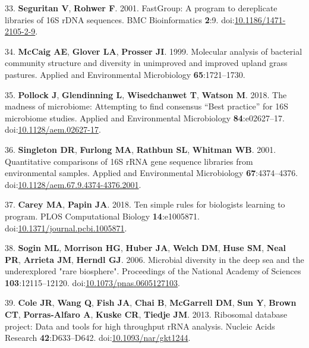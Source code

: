 \documentclass[11pt,]{article}
\begin{document}
\leavevmode\hypertarget{ref-Seguritan2001}{}%
33. \textbf{Seguritan V}, \textbf{Rohwer F}. 2001. FastGroup: A program
to dereplicate libraries of 16S rDNA sequences. BMC Bioinformatics
\textbf{2}:9.
doi:\href{https://doi.org/10.1186/1471-2105-2-9}{10.1186/1471-2105-2-9}.

\leavevmode\hypertarget{ref-McCaig1999}{}%
34. \textbf{McCaig AE}, \textbf{Glover LA}, \textbf{Prosser JI}. 1999.
Molecular analysis of bacterial community structure and diversity in
unimproved and improved upland grass pastures. Applied and Environmental
Microbiology \textbf{65}:1721--1730.

\leavevmode\hypertarget{ref-Pollock2018}{}%
35. \textbf{Pollock J}, \textbf{Glendinning L}, \textbf{Wisedchanwet T},
\textbf{Watson M}. 2018. The madness of microbiome: Attempting to find
consensus ``Best practice'' for 16S microbiome studies. Applied and
Environmental Microbiology \textbf{84}:e02627--17.
doi:\href{https://doi.org/10.1128/aem.02627-17}{10.1128/aem.02627-17}.

\leavevmode\hypertarget{ref-Singleton2001}{}%
36. \textbf{Singleton DR}, \textbf{Furlong MA}, \textbf{Rathbun SL},
\textbf{Whitman WB}. 2001. Quantitative comparisons of 16S rRNA gene
sequence libraries from environmental samples. Applied and Environmental
Microbiology \textbf{67}:4374--4376.
doi:\href{https://doi.org/10.1128/aem.67.9.4374-4376.2001}{10.1128/aem.67.9.4374-4376.2001}.

\leavevmode\hypertarget{ref-Carey2018}{}%
37. \textbf{Carey MA}, \textbf{Papin JA}. 2018. Ten simple rules for
biologists learning to program. PLOS Computational Biology
\textbf{14}:e1005871.
doi:\href{https://doi.org/10.1371/journal.pcbi.1005871}{10.1371/journal.pcbi.1005871}.

\leavevmode\hypertarget{ref-Sogin2006}{}%
38. \textbf{Sogin ML}, \textbf{Morrison HG}, \textbf{Huber JA},
\textbf{Welch DM}, \textbf{Huse SM}, \textbf{Neal PR}, \textbf{Arrieta
JM}, \textbf{Herndl GJ}. 2006. Microbial diversity in the deep sea and
the underexplored "rare biosphere". Proceedings of the National Academy
of Sciences \textbf{103}:12115--12120.
doi:\href{https://doi.org/10.1073/pnas.0605127103}{10.1073/pnas.0605127103}.

\leavevmode\hypertarget{ref-Cole2013}{}%
39. \textbf{Cole JR}, \textbf{Wang Q}, \textbf{Fish JA}, \textbf{Chai
B}, \textbf{McGarrell DM}, \textbf{Sun Y}, \textbf{Brown CT},
\textbf{Porras-Alfaro A}, \textbf{Kuske CR}, \textbf{Tiedje JM}. 2013.
Ribosomal database project: Data and tools for high throughput rRNA
analysis. Nucleic Acids Research \textbf{42}:D633--D642.
doi:\href{https://doi.org/10.1093/nar/gkt1244}{10.1093/nar/gkt1244}.
\end{document}
